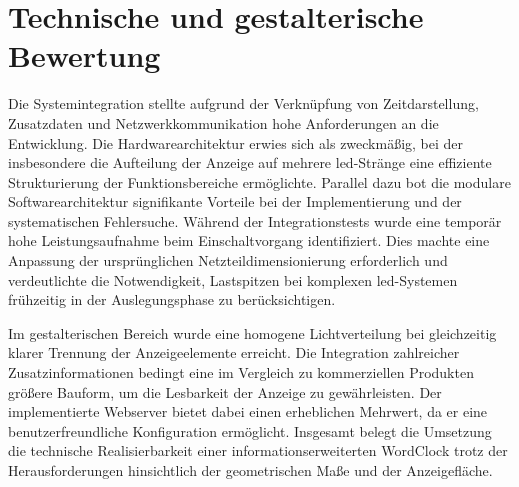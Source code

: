 \section{Technische und gestalterische Bewertung}
Die Systemintegration stellte aufgrund der Verknüpfung von Zeitdarstellung, Zusatzdaten und Netzwerkkommunikation hohe Anforderungen an die Entwicklung.
Die Hardwarearchitektur erwies sich als zweckmäßig, bei der insbesondere die Aufteilung der Anzeige auf mehrere \gls{led}-Stränge eine effiziente Strukturierung der Funktionsbereiche ermöglichte.
Parallel dazu bot die modulare Softwarearchitektur signifikante Vorteile bei der Implementierung und der systematischen Fehlersuche.
Während der Integrationstests wurde eine temporär hohe Leistungsaufnahme beim Einschaltvorgang identifiziert.
Dies machte eine Anpassung der ursprünglichen Netzteildimensionierung erforderlich und verdeutlichte die Notwendigkeit, Lastspitzen bei komplexen \gls{led}-Systemen frühzeitig in der Auslegungsphase zu berücksichtigen.

Im gestalterischen Bereich wurde eine homogene Lichtverteilung bei gleichzeitig klarer Trennung der Anzeigeelemente erreicht.
Die Integration zahlreicher Zusatzinformationen bedingt eine im Vergleich zu kommerziellen Produkten größere Bauform, um die Lesbarkeit der Anzeige zu gewährleisten.
Der implementierte Webserver bietet dabei einen erheblichen Mehrwert, da er eine benutzerfreundliche Konfiguration ermöglicht.
Insgesamt belegt die Umsetzung die technische Realisierbarkeit einer informationserweiterten WordClock trotz der Herausforderungen hinsichtlich der geometrischen Maße und der Anzeigefläche.